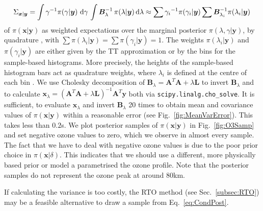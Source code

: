 \begin{align}
	\Sigma_{\bm{x}|\bm{y}} = \int \gamma^{-1}  \pi(\gamma | \bm{y} ) \, \mathop{}\!\mathrm{d} \gamma \, \int  \bm{B}_{\lambda}^{-1} \, \pi(\lambda | \bm{y} )  \, \text{d} \lambda  \approx \sum {\gamma_i}^{-1}\pi(\gamma_i| \bm{y}) \sum \bm{B}_{\lambda_i}^{-1}\pi(\lambda_i| \bm{y})\, \label{eq:CovInt}
\end{align}
of $\pi(\bm{x}| \bm{y})$ as weighted expectations over the marginal posterior $\pi(\lambda,\gamma | \bm{y})$, by quadrature \cite[Sec. 2.1]{Dick_Kuo_Sloan_2013}, with $\sum \pi(\lambda_i| \bm{y}) = \sum \pi(\gamma_i| \bm{y}) = 1$.
The weights $\pi(\lambda_i| \bm{y})$ and $\pi(\gamma_i| \bm{y})$ are either given by the TT approximation or by the bins for the sample-based histograms.
More precisely, the heights of the sample-based histogram bars act as quadrature weights, where $\lambda_i$ is defined at the centre of each bin .
We use Cholesky decomposition of $\bm{B}_{\lambda} = \bm{A}^T \bm{A} + \lambda \bm{L}$ to invert $\bm{B}_{\lambda}$ and to calculate $\bm{x}_{\lambda} = (\bm{A}^T \bm{A} + \lambda \bm{L} )^{-1} \bm{A}^T \bm{y}$ both via \texttt{scipy.linalg.cho\_solve}.
It is sufficient, to evaluate $\bm{x}_{\lambda}$ and invert $\bm{B}_{\lambda}$ 20 times to obtain mean and covariance values of $\pi(\bm{x}|\bm{y})$ within a reasonable error (see Fig.~\ref{fig:MeanVarError}).
This takes less than $0.2$s.
We plot posterior samples of $\pi(\bm{x}|\bm{y})$ in Fig.~\ref{fig:O3Samp} and set negative ozone values to zero, which we observe in almost every sample.
The fact that we have to deal with negative ozone values is due to the poor prior choice in $\pi(\bm{x}|\delta)$.
This indicates that we should use a different, more physically based prior or model a parametrised the ozone profile.
Note that the posterior samples do not represent the ozone peak at around $80$km.

If calculating the variance is too costly, the RTO method (see Sec.~\ref{subsec:RTO}) may be a feasible alternative to draw a sample from Eq.~\ref{eq:CondPost}.

